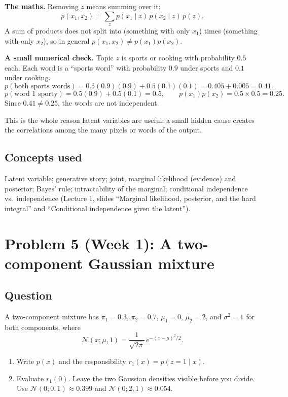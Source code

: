 \documentclass[12pt,a4paper]{article}
\begin{document}
\textbf{The maths.} Removing $z$ means summing over it:
\[
p(x_1, x_2) = \sum_z p(x_1 \mid z)\, p(x_2 \mid z)\, p(z).
\]
A sum of products does not split into (something with only $x_1$) times (something with only $x_2$), so in general $p(x_1,x_2) \neq p(x_1)p(x_2)$.

\textbf{A small numerical check.} Topic $z$ is sports or cooking with probability $0.5$ each. Each word is a ``sports word'' with probability $0.9$ under sports and $0.1$ under cooking.
\[
p(\text{both sports words}) = 0.5(0.9)(0.9) + 0.5(0.1)(0.1) = 0.405 + 0.005 = 0.41.
\]
\[
p(\text{word 1 sporty}) = 0.5(0.9) + 0.5(0.1) = 0.5, \qquad p(x_1)p(x_2) = 0.5 \times 0.5 = 0.25.
\]
Since $0.41 \neq 0.25$, the words are not independent.

This is the whole reason latent variables are useful: a small hidden cause creates the correlations among the many pixels or words of the output.

\subsection{Concepts used}

Latent variable; generative story; joint, marginal likelihood (evidence) and posterior; Bayes' rule; intractability of the marginal; conditional independence vs.\ independence (Lecture 1, slides ``Marginal likelihood, posterior, and the hard integral'' and ``Conditional independence given the latent'').

\section{Problem 5 (Week 1): A two-component Gaussian mixture}

\subsection{Question}

A two-component mixture has $\pi_1 = 0.3$, $\pi_2 = 0.7$, $\mu_1 = 0$, $\mu_2 = 2$, and $\sigma^2 = 1$ for both components, where
\[
\mathcal{N}(x; \mu, 1) = \frac{1}{\sqrt{2\pi}}\, e^{-(x-\mu)^2/2}.
\]

\begin{enumerate}[leftmargin=*]
\item Write $p(x)$ and the responsibility $r_1(x) = p(z = 1 \mid x)$.
\item Evaluate $r_1(0)$. Leave the two Gaussian densities visible before you divide. Use $\mathcal{N}(0; 0, 1) \approx 0.399$ and $\mathcal{N}(0; 2, 1) \approx 0.054$.
\end{enumerate}
\end{document}
